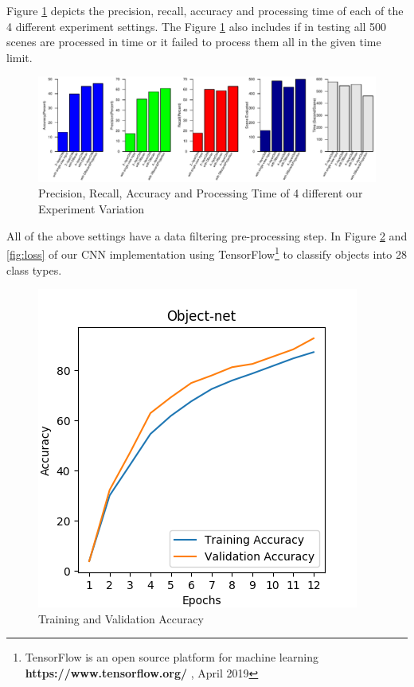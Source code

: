 Figure \ref{fig:evaluation2} depicts the precision, recall, accuracy and processing time of each of the 4 different experiment settings.
The Figure \ref{fig:evaluation2} also includes if in testing all 500 scenes are processed in time
or it failed to process them all in the given time limit.
\begin{figure}[htp]
\begin{center}
  \includegraphics[width=1\linewidth]{images/evaluation2.pdf}
  \caption{Precision, Recall, Accuracy and Processing Time of 4 different our Experiment Variation}
  \label{fig:evaluation2}
\end{center}
\end{figure}
All of the above settings have a data filtering pre-processing step. In Figure \ref{fig:accuracy} and \ref{fig:loss} of our CNN implementation 
using TensorFlow\footnote{TensorFlow is an open source platform for machine learning \textbf{https://www.tensorflow.org/} , April 2019 } to classify objects into 28 class
types.
\begin{figure}[htp]
\begin{center}
        \includegraphics[scale=0.5]{images/accuracy.png}
        \caption{Training and Validation Accuracy}
        \label{fig:accuracy}
\end{center}
\end{figure}
